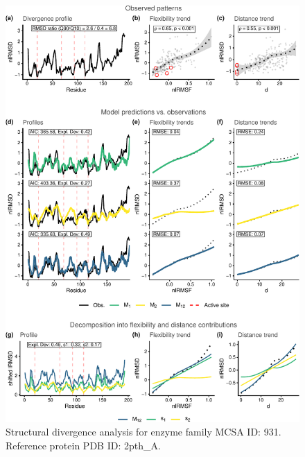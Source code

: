 \documentclass[
]{article}
\begin{document}
\clearpage
\begin{figure}[H]
\centering


\begin{center}\includegraphics{supplementary_material_files/figure-latex/generate_figures-34} \end{center}

\caption{Structural divergence analysis for enzyme family MCSA ID: 931. Reference protein PDB ID: 2pth\_A.}
\end{figure}
\end{document}
